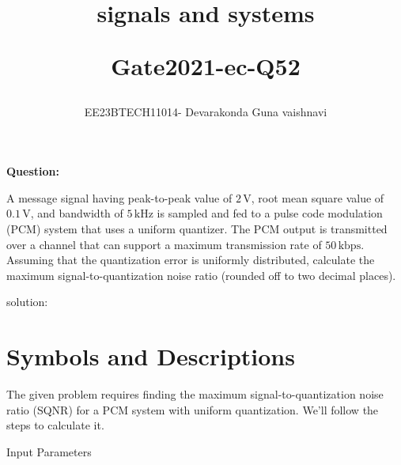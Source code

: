 \documentclass[a4,12pt,onecolumn]{IEEEtran}
\begin{document}
\title{ signals and systems
\vspace{1cm}

Gate2021-ec-Q52}
\author{EE23BTECH11014- Devarakonda Guna vaishnavi}
\maketitle
\textbf{Question:}

A message signal having peak-to-peak value of $2 \, \text{V}$, root mean square value of $0.1 \, \text{V}$, and bandwidth of $5 \, \text{kHz}$ is sampled and fed to a pulse code modulation (PCM) system that uses a uniform quantizer. The PCM output is transmitted over a channel that can support a maximum transmission rate of $50 \, \text{kbps}$. Assuming that the quantization error is uniformly distributed, calculate the maximum signal-to-quantization noise ratio (rounded off to two decimal places).

solution:
\section*{Symbols and Descriptions}

The given problem requires finding the maximum signal-to-quantization noise ratio (SQNR) for a PCM system with uniform quantization. We'll follow the steps to calculate it.
\begin{table}[h!]
    \centering
    
    \caption{Input Parameters}
    \label{table:parameters}
\end{table}
\end{document}

